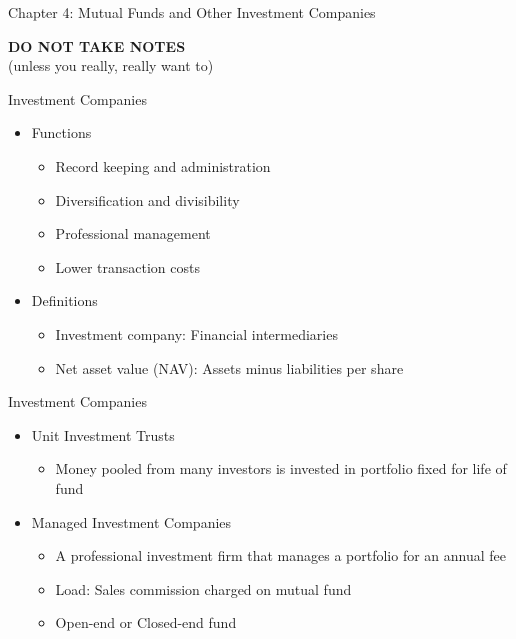 \documentclass{beamer}
\begin{document}
\begin{frame}{Chapter 4: Mutual Funds and Other Investment Companies}
\begin{center}
\textbf{\Large DO NOT TAKE NOTES}\\ {\footnotesize(unless you really, really want to)}
\end{center}
\end{frame}

\begin{frame}{Investment Companies}
\begin{itemize}
\item Functions
\begin{itemize}
\item Record keeping and administration
\item Diversification and divisibility
\item Professional management
\item Lower transaction costs
\end{itemize}
\item Definitions
\begin{itemize}
\item Investment company:  Financial intermediaries
\item Net asset value (NAV): Assets minus liabilities per share
\end{itemize}
\end{itemize}
\end{frame}

\begin{frame}{Investment Companies}
\begin{itemize}
\item Unit Investment Trusts
\begin{itemize}
\item Money pooled from many investors is invested in portfolio fixed for life of fund
\end{itemize}
\item Managed Investment Companies
\begin{itemize}
\item A professional investment firm that manages a portfolio for an annual fee
\item Load: Sales commission charged on mutual fund
\item Open-end or Closed-end fund
\end{itemize}
\end{itemize}
\end{frame}
\end{document}
